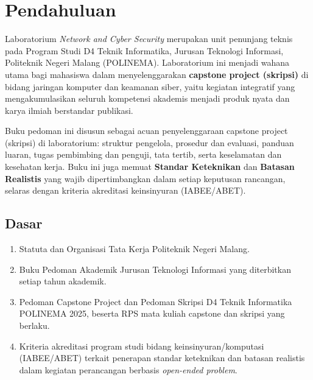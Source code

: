 \documentclass[12pt,a4paper]{report}
\begin{document}
\PedomanCover

\clearpage
\tableofcontents

\clearpage
{}

\chapter{Pendahuluan}

Laboratorium \emph{Network and Cyber Security} merupakan unit penunjang teknis pada Program Studi D4 Teknik Informatika, Jurusan Teknologi Informasi, Politeknik Negeri Malang (POLINEMA). Laboratorium ini menjadi wahana utama bagi mahasiswa dalam menyelenggarakan \textbf{capstone project (skripsi)} di bidang jaringan komputer dan keamanan siber, yaitu kegiatan integratif yang mengakumulasikan seluruh kompetensi akademis menjadi produk nyata dan karya ilmiah berstandar publikasi.

Buku pedoman ini disusun sebagai acuan penyelenggaraan capstone project (skripsi) di laboratorium: struktur pengelola, prosedur dan evaluasi, panduan luaran, tugas pembimbing dan penguji, tata tertib, serta keselamatan dan kesehatan kerja. Buku ini juga memuat \textbf{Standar Keteknikan} dan \textbf{Batasan Realistis} yang wajib dipertimbangkan dalam setiap keputusan rancangan, selaras dengan kriteria akreditasi keinsinyuran (IABEE/ABET).

\section{Dasar}
\begin{enumerate}
\item Statuta dan Organisasi Tata Kerja Politeknik Negeri Malang.
\item Buku Pedoman Akademik Jurusan Teknologi Informasi yang diterbitkan setiap tahun akademik.
\item Pedoman Capstone Project dan Pedoman Skripsi D4 Teknik Informatika POLINEMA 2025, beserta RPS mata kuliah capstone dan skripsi yang berlaku.
\item Kriteria akreditasi program studi bidang keinsinyuran/komputasi (IABEE/ABET) terkait penerapan standar keteknikan dan batasan realistis dalam kegiatan perancangan berbasis \emph{open-ended problem}.
\end{enumerate}
\end{document}
